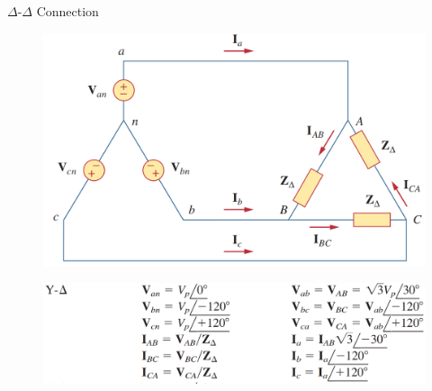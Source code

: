 \documentclass{beamer}
\begin{document}
\begin{frame}{$\Delta$-$\Delta$ Connection}
    \begin{figure}[H]
        \centering
        \includegraphics[scale = 0.35]{C12/yd.png}
        \label{fig:enter-label}
    \end{figure}
    \begin{figure}[H]
        \centering
        \includegraphics[scale = 0.3]{C12/yd1.png}
        \label{fig:enter-label}
    \end{figure}
\end{frame}
\end{document}

